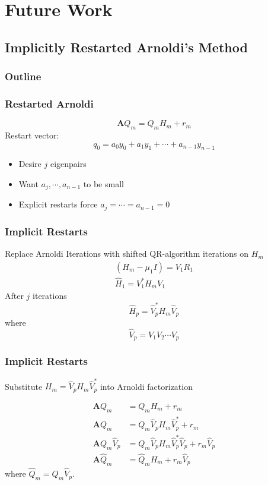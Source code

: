 \documentclass[color={usenames, dvipsnames},ignorenonframetext]{beamer}
\newcommand{\A}{\mathbf{A}}
\begin{document}
\section{Future Work}
\subsection{Implicitly Restarted Arnoldi's Method}
\begin{frame}
    \frametitle{Outline}
    \tableofcontents[pausesection]
\end{frame}

\begin{frame}
    \frametitle{Restarted Arnoldi}
    \begin{equation*}
        \A Q_m = Q_{m}H_{m} + r_m
    \end{equation*}
    \vspace{2ex}
    Restart vector:
    \begin{equation*}
        q_0 = a_0y_0 + a_1y_1 + \cdots + a_{n-1}y_{n-1}
    \end{equation*}
    
    \pause
    \begin{itemize}[<+->]
        \item Desire $j$ eigenpairs
        \item Want $a_j, \cdots, a_{n-1}$ to be small
        \item Explicit restarts force $a_j = \cdots = a_{n-1} = 0$
    \end{itemize}
\end{frame}

\begin{frame}
    \frametitle{Implicit Restarts}
    Replace Arnoldi Iterations with shifted QR-algorithm iterations on $H_m$
    \begin{gather*}
       \left(H_m - \mu_1I\right) = V_1R_1 \\[1ex]
       \hat{H}_1 = V_1^*H_mV_1
    \end{gather*}
    After $j$ iterations
    \begin{equation*}
        \hat{H}_p = \hat{V}_p^*H_m\hat{V}_p
    \end{equation*}
    where 
    \begin{equation*}
        \hat{V}_p = V_1V_2\cdots V_p
    \end{equation*}
\end{frame}

\begin{frame}
    \frametitle{Implicit Restarts}
    Substitute $H_m = \hat{V}_pH_m\hat{V}_p^*$ into Arnoldi factorization

    \begin{align*}
        \A Q_m &= Q_{m}H_{m} + r_m \\
        \A Q_m &= Q_{m}\hat{V}_pH_m\hat{V}_p^* + r_m \\
        \A Q_m\hat{V}_p &= Q_{m}\hat{V}_pH_m\hat{V}_p^*\hat{V}_p + r_m\hat{V}_p \\
        \A \hat{Q}_m &= \hat{Q}_mH_m + r_m\hat{V}_p
    \end{align*}
    where $\hat{Q}_m = Q_m\hat{V}_p$.

\end{frame}
\end{document}
